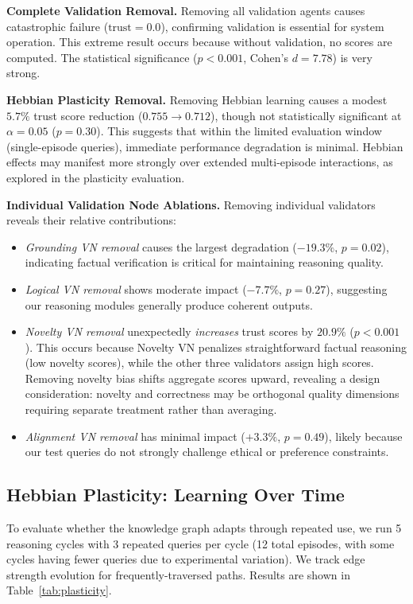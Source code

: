 \documentclass{article}
\begin{document}
\textbf{Complete Validation Removal.} Removing all validation agents causes catastrophic failure ($\text{trust} = 0.0$), confirming validation is essential for system operation. This extreme result occurs because without validation, no scores are computed. The statistical significance ($p < 0.001$, Cohen's $d = 7.78$) is very strong.

\textbf{Hebbian Plasticity Removal.} Removing Hebbian learning causes a modest $5.7\%$ trust score reduction ($0.755 \to 0.712$), though not statistically significant at $\alpha = 0.05$ ($p = 0.30$). This suggests that within the limited evaluation window (single-episode queries), immediate performance degradation is minimal. Hebbian effects may manifest more strongly over extended multi-episode interactions, as explored in the plasticity evaluation.

\textbf{Individual Validation Node Ablations.} Removing individual validators reveals their relative contributions:

\begin{itemize}
    \item \textit{Grounding VN removal} causes the largest degradation ($-19.3\%$, $p = 0.02$), indicating factual verification is critical for maintaining reasoning quality.
    \item \textit{Logical VN removal} shows moderate impact ($-7.7\%$, $p = 0.27$), suggesting our reasoning modules generally produce coherent outputs.
    \item \textit{Novelty VN removal} unexpectedly \textit{increases} trust scores by $20.9\%$ ($p < 0.001$). This occurs because Novelty VN penalizes straightforward factual reasoning (low novelty scores), while the other three validators assign high scores. Removing novelty bias shifts aggregate scores upward, revealing a design consideration: novelty and correctness may be orthogonal quality dimensions requiring separate treatment rather than averaging.
    \item \textit{Alignment VN removal} has minimal impact ($+3.3\%$, $p = 0.49$), likely because our test queries do not strongly challenge ethical or preference constraints.
\end{itemize}

\subsection{Hebbian Plasticity: Learning Over Time}

To evaluate whether the knowledge graph adapts through repeated use, we run 5 reasoning cycles with 3 repeated queries per cycle (12 total episodes, with some cycles having fewer queries due to experimental variation). We track edge strength evolution for frequently-traversed paths. Results are shown in Table~\ref{tab:plasticity}.
\end{document}
